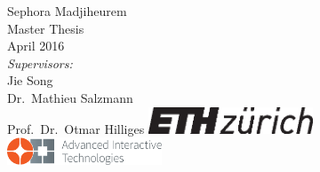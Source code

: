 \documentclass[a4paper,twoside,12pt]{scrbook}
\begin{document}
\begin{titlepage}
	\vspace{3cm}
	\sffamily
	\Large
	Sephora Madjiheurem
	\\[0.8cm]
	\large
	Master Thesis
	\\
	April 2016
	\\[1.3cm]
	\emph{Supervisors:}\\
	Jie Song\\
	Dr.\ Mathieu Salzmann\\
	Prof.\ Dr.\ Otmar Hilliges		%
	\vfill
	\includegraphics*[height=0.8cm]{figures/eth_logo_kurz_pos.eps} \hfill
	\includegraphics*[height=0.8cm]{figures/logo-ait}
	\vspace{3.4cm}
\end{titlepage}
\clearemptydoublepage

\setcounter{page}{1}





\setcounter{tocdepth}{1}
\tableofcontents

\cleardoublepage
{}
{}
\listoffigures

\cleardoublepage
{}
{}
\listoftables
\cleardoublepage

\renewcommand*{\chapterpagestyle}{mychapterpagestyle}
\renewcommand*{\chapterformat}{} %
\renewcommand*{\sectionformat}{\thesection\enskip\enskip}
\renewcommand*{\subsectionformat}{\thesubsection\enskip}
\renewcommand*{\tableformat}{\tablename~\thetable}
\renewcommand*{\figureformat}{\figurename~\thefigure}
\captionsetup{subrefformat=parens}
\end{document}

